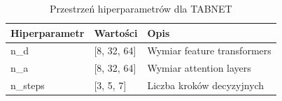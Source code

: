 \begin{table}[h]
\centering
\caption{Przestrzeń hiperparametrów dla TABNET}
\label{tab:hyperparams_tabnet}
\begin{tabular}{lll}
\toprule
Hiperparametr & Wartości & Opis \\
\midrule
n\_d & [8, 32, 64] & Wymiar feature transformers \\
n\_a & [8, 32, 64] & Wymiar attention layers \\
n\_steps & [3, 5, 7] & Liczba kroków decyzyjnych \\
\bottomrule
\end{tabular}
\end{table}
